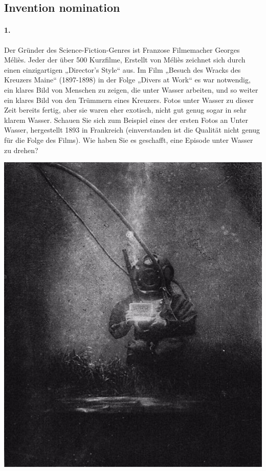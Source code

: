 \documentclass[11pt,a4paper]{article}
\begin{document}
\subsection*{Invention nomination}

\begin{minipage}{.6\textwidth}
  \paragraph{1.}
  Der Gründer des Science-Fiction-Genres ist Franzose Filmemacher Georges
  Méliès. Jeder der über 500 Kurzfilme, Erstellt von Méliès zeichnet sich
  durch einen einzigartigen „Director's Style“ aus. Im Film „Besuch des Wracks
  des Kreuzers Maine“ (1897-1898) in der Folge „Divers at Work“ es war
  notwendig, ein klares Bild von Menschen zu zeigen, die unter Wasser
  arbeiten, und so weiter ein klares Bild von den Trümmern eines
  Kreuzers. Fotos unter Wasser zu dieser Zeit bereits fertig, aber sie waren
  eher exotisch, nicht gut genug sogar in sehr klarem Wasser. Schauen Sie sich
  zum Beispiel eines der ersten Fotos an Unter Wasser, hergestellt 1893 in
  Frankreich (einverstanden ist die Qualität nicht genug für die Folge des
  Films). Wie haben Sie es geschafft, eine Episode unter Wasser zu drehen?
\end{minipage}\hfill
\begin{minipage}{.35\textwidth}
  \includegraphics[width=\textwidth]{Bild-1.jpg}
\end{minipage}
\medskip
\end{document}
